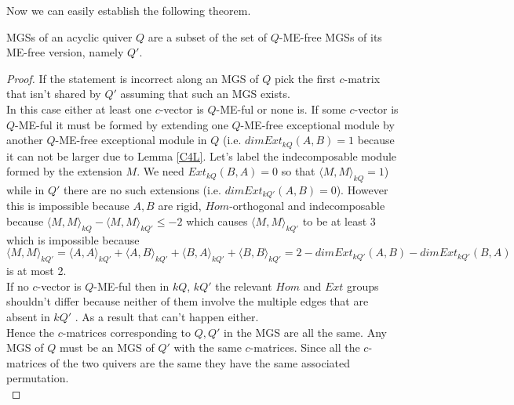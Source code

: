 \indent Now we can easily establish the following theorem.
\begin{theorem}
MGSs of an acyclic quiver $Q$ are a subset of the set of $Q$-ME-free MGSs of its ME-free version, namely $Q'$.\label{C4T1B}
\end{theorem}
\begin{proof}
\indent If the statement is incorrect along an MGS of $Q$ pick the first $c$-matrix that isn't shared by $Q'$ assuming that such an MGS exists. \\
\indent In this case either at least one $c$-vector is $Q$-ME-ful or none is. If some $c$-vector is $Q$-ME-ful it must be formed by extending one $Q$-ME-free exceptional module by another $Q$-ME-free exceptional module in $Q$ (i.e. $dim Ext_{kQ}(A,B) = 1$ because it can not be larger due to Lemma \ref{C4L}. Let's label the indecomposable module formed by the extension $M$. We need $Ext_{kQ}(B,A) = 0$ so that $\langle M,M\rangle_{kQ} = 1$) while in $Q'$  there are no such extensions (i.e. $dim Ext_{kQ'}(A,B) = 0$). However this is impossible because $A, B$ are rigid, $Hom$-orthogonal and indecomposable because $\langle M,M\rangle_{kQ} - \langle M,M\rangle_{kQ'} \leq -2$ which causes $\langle M,M\rangle_{kQ'}$ to be at least 3 which is impossible because $\langle M,M\rangle_{kQ'} = \langle A,A\rangle_{kQ'} + \langle A,B\rangle_{kQ'} + \langle B,A\rangle_{kQ'} + \langle B,B\rangle_{kQ'} = 2 - dim Ext_{kQ'}(A,B) - dim Ext_{kQ'}(B,A)$ is at most 2.\\
\indent If no $c$-vector is $Q$-ME-ful then in $kQ$, $kQ'$ the relevant $Hom$ and $Ext$ groups shouldn't differ because neither of them involve the multiple edges that are absent in $kQ'$ . As a result that can't happen either.\\
\indent Hence the $c$-matrices corresponding to $Q, Q'$ in the MGS are all the same. Any MGS of $Q$ must be an MGS of $Q'$ with the same $c$-matrices. Since all the $c$-matrices of the two quivers are the same they have the same associated permutation.\\
\end{proof}
